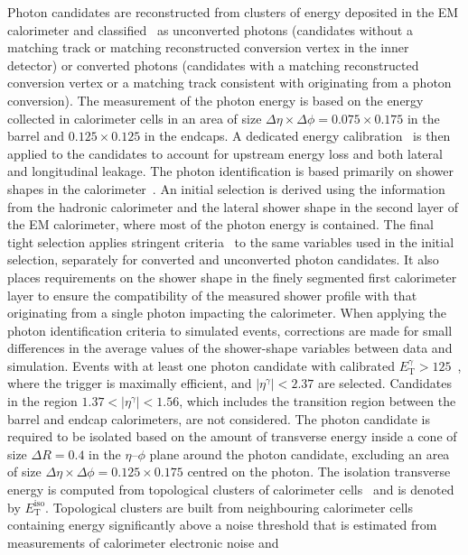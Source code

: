 \documentclass[cernpreprint,texlive=2016,txfonts,UKenglish]{latex/atlasdoc}
\def\etg{E_{\mathrm{T}}^{\gamma}}
\def\etag{\eta^{\gamma}}
\def\etiso{E_{\mathrm{T}}^{\mathrm{iso}}}
\begin{document}
\nopagebreak
Photon candidates are reconstructed from clusters of energy deposited
in the EM calorimeter and  classified~\cite{epj:c76:666} as
unconverted photons (candidates without a matching track or matching
reconstructed conversion vertex in the inner detector) or converted
photons (candidates with a matching reconstructed conversion vertex or
a matching track consistent with originating from a photon
conversion). The measurement of the photon energy is based on the
energy collected in calorimeter cells in an area of size
$\Delta\eta\times\Delta\phi=0.075\times 0.175$ in the barrel and
$0.125\times 0.125$ in the endcaps. A dedicated energy
calibration~\cite{epj:c74:3071} is then applied to the candidates to
account for upstream energy loss and both lateral and longitudinal
leakage. The photon identification is based primarily on shower shapes
in the calorimeter~\cite{epj:c76:666}. An initial selection is derived
using the information from the hadronic calorimeter and the lateral
shower shape in the second layer of the EM calorimeter, where most of
the photon energy is contained. The final tight selection applies
stringent criteria~\cite{epj:c76:666} to the same variables used in
the initial selection, separately for converted and unconverted photon
candidates. It also places requirements on the shower shape in the
finely segmented first calorimeter layer to ensure the compatibility
of the measured shower profile with that originating from a single
photon impacting the calorimeter. When applying the photon
identification criteria to simulated events, corrections are made for
small differences in the average values of the shower-shape variables
between data and simulation. Events with at least one photon candidate
with calibrated $\etg>125$~\GeV, where the trigger is maximally
efficient, and $|\etag|<2.37$ are selected. Candidates in the region
$1.37<|\etag|<1.56$, which includes the transition region between the
barrel and endcap calorimeters, are not considered. The photon
candidate is required to be isolated based on the amount of transverse
energy inside a cone of size $\Delta R=0.4$ in the $\eta$--$\phi$
plane around the photon candidate, excluding an area of size
$\Delta\eta \times \Delta\phi = 0.125 \times 0.175$ centred on the
photon. The isolation transverse energy is computed from topological
clusters of calorimeter cells~\cite{epj:c77:490} and is denoted by
$\etiso$. Topological clusters are built from neighbouring calorimeter
cells containing energy significantly above a noise threshold that is
estimated from measurements of calorimeter electronic noise and
\end{document}

